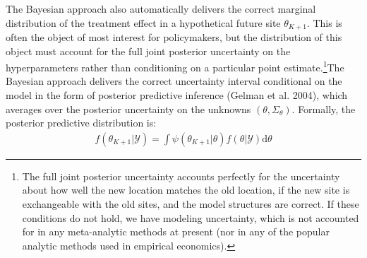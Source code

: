 \documentclass[AER]{AEA}
\begin{document}
The Bayesian approach also automatically delivers the correct marginal distribution of the treatment effect in a hypothetical future site $\theta_{K+1}$. This is often the object of most interest for policymakers, but the distribution of this object must account for the full joint posterior uncertainty on the hyperparameters rather than conditioning on a particular point estimate.\footnote{The full joint posterior uncertainty accounts perfectly for the uncertainty about how well the new location matches the old location, if the new site is exchangeable with the old sites, and the model structures are correct. If these conditions do not hold, we have modeling uncertainty, which is not accounted for in any meta-analytic methods at present (nor in any of the popular analytic methods used in empirical economics).}The Bayesian approach delivers the correct uncertainty interval conditional on the model in the form of posterior predictive inference (Gelman et al. 2004), which averages over the posterior uncertainty on the unknowns $(\theta, \Sigma_{\theta})$. Formally, the posterior predictive distribution is:
\begin{equation}
\begin{aligned}
f(\theta_{K+1} | \mathcal{Y}) = \int \psi(\theta_{K+1} | \theta)f(\theta | \mathcal{Y})\text{d} \theta
\end{aligned}
\label{posterior predictive}
\end{equation}
\end{document}
